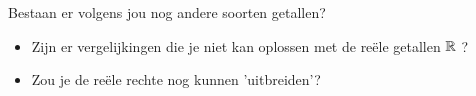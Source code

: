 \documentclass{ximera}
\begin{document}
\begin{denkvraag*}{} 
    
    Bestaan er volgens jou nog andere soorten getallen? 
\begin{itemize}
    \item Zijn er vergelijkingen die je niet kan oplossen met de reële getallen \( \mathbb{R} \) ?
    \item Zou je de reële rechte nog kunnen 'uitbreiden'? 
    
\end{itemize}
\end{denkvraag*}

\end{document}
